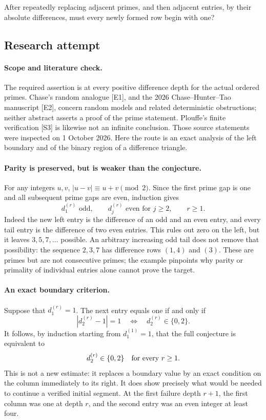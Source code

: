 \documentclass[11pt,a4paper]{article}
\begin{document}
After repeatedly replacing adjacent primes, and then adjacent entries, by their absolute differences, must every newly formed row begin with one?

\subsection{Research attempt}

\paragraph{Scope and literature check.}
The required assertion is at every positive difference depth for the
actual ordered primes. Chase's random analogue [E1], and the 2026
Chase--Hunter--Tao manuscript [E2], concern random models and related
deterministic obstructions; neither abstract asserts a proof of the
prime statement. Plouffe's finite verification [S3] is likewise not an
infinite conclusion. Those source statements were inspected on
1 October 2026. Here the route is an exact analysis of the left boundary
and of the binary region of a difference triangle.

\paragraph{Parity is preserved, but is weaker than the conjecture.}
For any integers $u,v$, $|u-v|\equiv u+v\pmod2$. Since the first
prime gap is one and all subsequent prime gaps are even, induction gives
\[
 d_1^{(r)}\text{ odd},\qquad d_j^{(r)}\text{ even for }j\ge2,
 \qquad r\ge1.
\]
Indeed the new left entry is the difference of an odd and an even entry,
and every tail entry is the difference of two even entries. This rules
out zero on the left, but it leaves $3,5,7,\ldots$ possible. An arbitrary
increasing odd tail does not remove that possibility: the sequence
$2,3,7$ has difference rows $(1,4)$ and $(3)$. These are primes but are
not consecutive primes; the example pinpoints why parity or primality
of individual entries alone cannot prove the target.

\paragraph{An exact boundary criterion.}
Suppose that $d_1^{(r)}=1$. The next entry equals one if and only if
\[
 |d_2^{(r)}-1|=1
 \quad\Longleftrightarrow\quad d_2^{(r)}\in\{0,2\}.
\]
It follows, by induction starting from $d_1^{(1)}=1$, that the full
conjecture is equivalent to
\[
 d_2^{(r)}\in\{0,2\}\quad\hbox{for every }r\ge1.
\]
This is not a new estimate: it replaces a boundary value by an exact
condition on the column immediately to its right. It does show precisely
what would be needed to continue a verified initial segment. At the first
failure depth $r+1$, the first column was one at depth $r$, and the
second entry was an even integer at least four.
\end{document}
